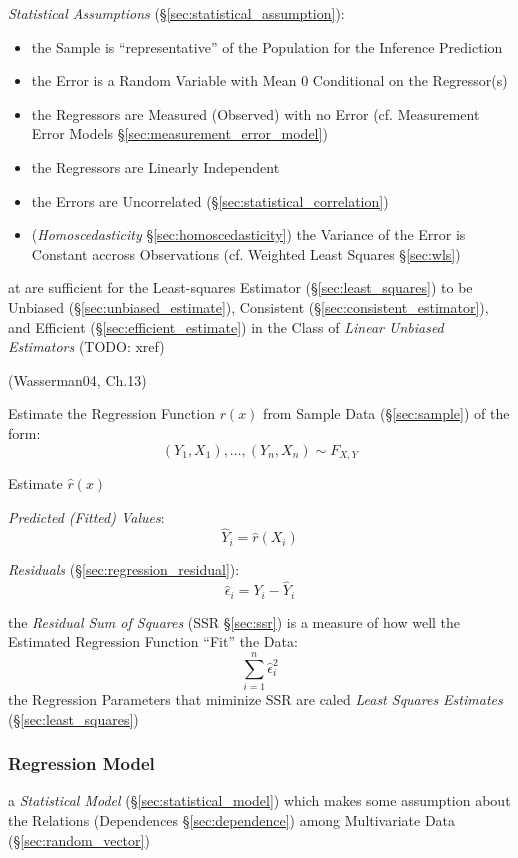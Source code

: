\emph{Statistical Assumptions} (\S\ref{sec:statistical_assumption}):
\begin{itemize}
  \item the Sample is ``representative'' of the Population for the Inference
    Prediction
  \item the Error is a Random Variable with Mean $0$ Conditional on the
    Regressor(s)
  \item the Regressors are Measured (Observed) with no Error (cf. Measurement
    Error Models \S\ref{sec:measurement_error_model})
  \item the Regressors are Linearly Independent
  \item the Errors are Uncorrelated (\S\ref{sec:statistical_correlation})
  \item (\emph{Homoscedasticity} \S\ref{sec:homoscedasticity}) the Variance of
    the Error is Constant accross Observations (cf. Weighted Least Squares
    \S\ref{sec:wls})
\end{itemize}
at are sufficient for the Least-squares Estimator (\S\ref{sec:least_squares}) to
be Unbiased (\S\ref{sec:unbiased_estimate}), Consistent
(\S\ref{sec:consistent_estimator}), and Efficient
(\S\ref{sec:efficient_estimate}) in the Class of \emph{Linear Unbiased
  Estimators} (TODO: xref)

\asterism

(Wasserman04, Ch.13)

Estimate the Regression Function $r(x)$ from Sample Data (\S\ref{sec:sample}) of
the form:
\[
  (Y_1,X_1), \ldots, (Y_n,X_n) \sim F_{X,Y}
\]

Estimate $\hat{r}(x)$

\emph{Predicted (Fitted) Values}:
\[
  \hat{Y}_i = \hat{r}(X_i)
\]

\emph{Residuals} (\S\ref{sec:regression_residual}):
\[
  \hat{\epsilon}_i = Y_i - \hat{Y}_i
\]

the \emph{Residual Sum of Squares} (SSR \S\ref{sec:ssr}) is a measure of how
well the Estimated Regression Function ``Fit'' the Data:
\[
  \sum_{i=1}^n \hat{\epsilon}_i^2
\]
the Regression Parameters that miminize SSR are caled \emph{Least Squares
  Estimates} (\S\ref{sec:least_squares})



\subsubsection{Regression Model}\label{sec:regression_model}

a \emph{Statistical Model} (\S\ref{sec:statistical_model}) which makes some
assumption about the Relations (Dependences \S\ref{sec:dependence}) among
Multivariate Data (\S\ref{sec:random_vector})

